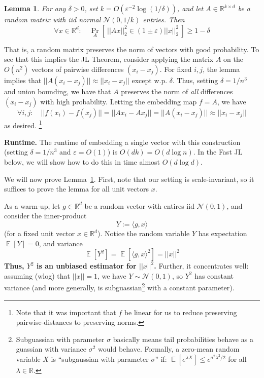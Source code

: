 \documentclass[]{article}
\newtheorem{lemma}{Lemma}
\newcommand{\1}{\mathbbm{1}}
\newcommand{\x}{\times}
\newcommand{\R}{\mathbb{R}}
\newcommand{\N}{\mathcal{N}}
\newcommand{\E}{\mathop{\mathbb{E}}}
\renewcommand{\epsilon}{\varepsilon}
\newcommand{\innp}[1]{\langle #1 \rangle}
\begin{document}
\begin{lemma}
    \label{lem:jl}
    For any $\delta > 0$, set $k = O(\epsilon^{-2}\log(1/\delta))$,
    and let $A \in \R^{k \x d}$ be a random matrix with iid normal $\N(0, 1/k)$ entries.
    Then
    $$\forall x \in \R^d: \quad
    \Pr_{A}\left[~ ||Ax||_2^2 \in  (1 \pm \epsilon)||x||_2^2 ~\right] \geq 1- \delta$$
\end{lemma}
That is, a random matrix preserves the norm of vectors with good probability.
To see that this implies the JL Theorem, consider applying the matrix $A$ on
the $O(n^2)$ vectors of pairwise differences $(x_i - x_j)$.
For fixed $i,j$, the lemma implies that
$||A(x_i - x_j)|| \approx ||x_i - x_j||$ except w.p. $\delta$.
Thus, setting $\delta = 1/n^3$ and union bounding, we have that $A$ preserves the norm of
\emph{all} differences $(x_i - x_j)$ with high probability.
Letting the embedding map $f = A$, we have
$$\forall i,j: \quad ||f(x_i) - f(x_j)|| = ||Ax_i - Ax_j|| =
||A(x_i - x_j)|| \approx
||x_i - x_j||$$
as desired.
\footnote{Note that it was important that $f$ be linear for us to reduce
preserving pairwise-distances to preserving norms.}

{\bf Runtime.} The runtime of embedding a single vector with this construction (setting
$\delta=1/n^3$ and $\epsilon=O(1)$) is
$O(dk) = O(d \log n)$. In the Fast JL below, we will show how to do this in
time almost $O(d \log d)$.


We will now prove Lemma~\ref{lem:jl}.
First, note that our setting is scale-invariant, so it suffices to prove the
lemma for all unit vectors $x$.

As a warm-up, let $g \in \R^d$ be a random vector with entires iid
$\N(0, 1)$, and consider the inner-product
$$Y := \innp{g, x}$$
(for a fixed unit vector $x \in \R^d$).
Notice the random variable $Y$
has expectation $\E[Y] = 0$,
and variance $$\E[Y^2] = \E[\innp{g,x}^2] = ||x||^2$$
{\bf Thus, $Y^2$ is an unbiased estimator for $||x||^2$.}
Further, it concentrates well: assuming (wlog) that $||x||=1$,
we have $Y \sim \N(0, 1)$, so $Y^2$ has constant variance (and more generally,
is subguassian\footnote{
    Subguassian with parameter $\sigma$ basically means
    tail probabilities behave as a guassian with variance $\sigma^2$ would behave.
    Formally, a zero-mean random variable $X$ is ``subgaussian with parameter
    $\sigma$'' if: $\E[e^{\lambda X}] \leq e^{\sigma^2\lambda^2/2}$ for all
    $\lambda \in \R$.
}
with a constant parameter).
\end{document}
